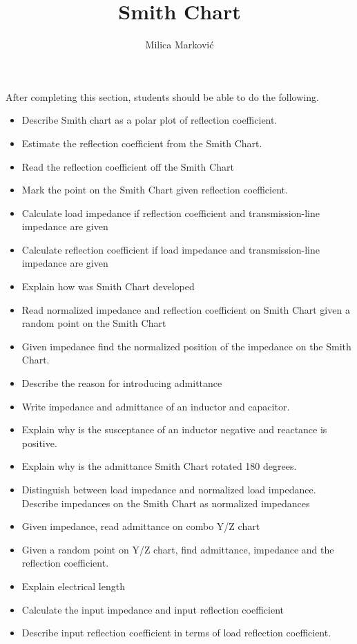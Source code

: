 \documentclass{ximera}
\title{Smith Chart}
\author{Milica Markovi{\'c}}
\begin{document}
\begin{abstract}
\end{abstract}

\maketitle

\begin{sectionOutcomes}

After completing this section, students should be able to do the following.

\begin{itemize}
\item Describe Smith chart as a polar plot of reflection coefficient.
\item Estimate the reflection coefficient from the Smith Chart.
\item Read the reflection coefficient off the Smith Chart
\item Mark the point on the Smith Chart given reflection coefficient.
\item Calculate load impedance if reflection coefficient and transmission-line impedance are given
\item Calculate reflection coefficient if load impedance and transmission-line impedance are given
\item Explain how was Smith Chart developed
\item Read normalized impedance and reflection coefficient on Smith Chart  given a random point on the Smith Chart
\item Given impedance find the normalized position of the impedance on the Smith Chart.
\item Describe the reason for introducing admittance
\item Write impedance and admittance of an inductor and capacitor. 
\item Explain why is the susceptance of an inductor negative and reactance is positive. 
\item Explain why is the admittance Smith Chart rotated 180 degrees.
\item Distinguish between load impedance and normalized load impedance. Describe impedances on the Smith Chart as normalized impedances
\item Given impedance, read admittance on combo Y/Z chart
\item Given a random point on Y/Z chart, find admittance, impedance and the reflection coefficient.
\item Explain electrical length
\item Calculate the input impedance and input reflection coefficient
\item Describe input reflection coefficient in terms of load reflection coefficient.
\end{itemize}

\end{sectionOutcomes}
\end{document}
